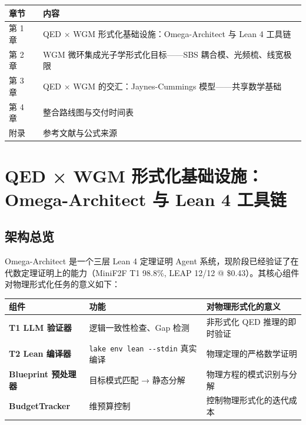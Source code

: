 \documentclass[
  11pt,
  a4paper,
]{ctexrep}
\newcounter{none} %
\begin{document}

{\def\LTcaptype{none} %
\begin{longtable}[]{@{}ll@{}}
\toprule\noalign{}
章节 & 内容 \\
\midrule\noalign{}
\endhead
\bottomrule\noalign{}
\endlastfoot
第 1 章 & QED × WGM 形式化基础设施：Omega-Architect 与 Lean 4 工具链 \\
第 2 章 & WGM 微环集成光子学形式化目标------SBS
耦合模、光频梳、线宽极限 \\
第 3 章 & QED × WGM 的交汇：Jaynes-Cummings 模型------共享数学基础 \\
第 4 章 & 整合路线图与交付时间表 \\
附录 & 参考文献与公式来源 \\
\end{longtable}
}


\chapter{QED × WGM 形式化基础设施：Omega-Architect 与 Lean 4
工具链}\label{qed-wgm-ux5f62ux5f0fux5316ux57faux7840ux8bbeux65bdomega-architect-ux4e0e-lean-4-ux5de5ux5177ux94fe}

\section{架构总览}\label{ux67b6ux6784ux603bux89c8}

Omega-Architect 是一个三层 Lean 4 定理证明 Agent
系统，现阶段已经验证了在代数定理证明上的能力（MiniF2F T1 98.8\%, LEAP
12/12 @ \$0.43）。其核心组件对物理形式化任务的意义如下：

{\def\LTcaptype{none} %
\begin{longtable}[]{@{}
  >{\raggedright\arraybackslash}p{}
  >{\raggedright\arraybackslash}p{}
  >{\raggedright\arraybackslash}p{}@{}}
\toprule\noalign{}
\begin{minipage}[b]{\linewidth}\raggedright
组件
\end{minipage} & \begin{minipage}[b]{\linewidth}\raggedright
功能
\end{minipage} & \begin{minipage}[b]{\linewidth}\raggedright
对物理形式化的意义
\end{minipage} \\
\midrule\noalign{}
\endhead
\bottomrule\noalign{}
\endlastfoot
\textbf{T1 LLM 验证器} & 逻辑一致性检查、Gap 检测 & 非形式化 QED
推理的即时验证 \\
\textbf{T2 Lean 编译器} & \texttt{lake\ env\ lean\ -\/-stdin} 真实编译 &
物理定理的严格数学证明 \\
\textbf{Blueprint 预处理器} & 目标模式匹配 → 静态分解 &
物理方程的模式识别与分解 \\
\textbf{BudgetTracker} & 4 维预算控制 & 控制物理形式化的迭代成本 \\
\end{longtable}
}
\end{document}
